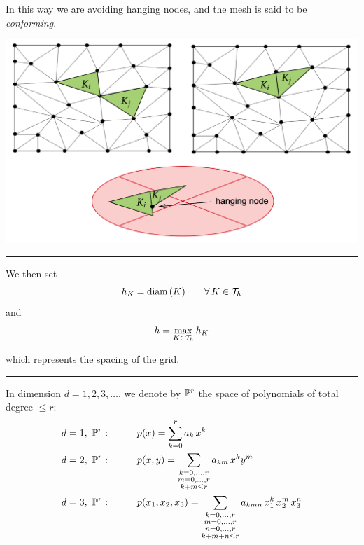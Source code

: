 In this way we are avoiding hanging nodes, and the mesh is said to be \emph{conforming}.
\begin{Figure}
    \centering
    \includegraphics[width=\linewidth]{images/hanging}
\end{Figure}

\rule{0.47\textwidth}{0.2pt}

\smallskip

We then set
\begin{equation*}
h_K=\text{diam}\,(K)\qquad\forall\,K\in\mathcal{T}_h
\end{equation*}
and
\begin{equation*}
h=\max_{K\in\mathcal{T}_h} h_K
\end{equation*}

which represents the spacing of the grid.

\rule{0.47\textwidth}{0.2pt}

\smallskip

In dimension $d=1,2,3,\dots$, we denote by $\mathbb{P}^r$ the space of polynomials of total degree $\leq r$:
\begin{equation*}
\begin{aligned}
&d=1,\ \mathbb{P}^r:\qquad && p(x)=\sum_{k=0}^r a_k\, x^k \\
&d=2,\ \mathbb{P}^r:\qquad && p(x,y)=\sum_{\substack{k=0,\dots,r \\
m=0,\dots,r \\
k+m\leq r} }  a_{km}\, x^k y^m \\
&d=3,\ \mathbb{P}^r:\qquad && p(x_1,x_2,x_3)=\sum_{\substack{k=0,\dots,r \\
m=0,\dots,r \\
n=0,\dots,r \\
k+m+n\leq r} }  a_{kmn}\, x_1^k \, x_2^m\, x_3^n \\
\end{aligned}
\end{equation*}

